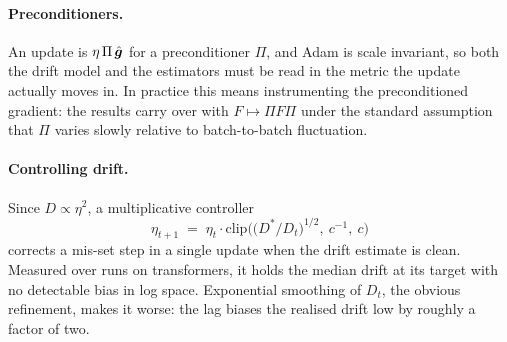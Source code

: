 \paragraph{Preconditioners.} An update is $\eta\,\Pi\,\hat{\bm{g}}$ for a preconditioner $\Pi$, and Adam
is scale invariant, so both the drift model and the estimators must be read in the metric the
update actually moves in. In practice this means instrumenting the preconditioned gradient: the
results carry over with $F \mapsto \Pi F \Pi$ under the standard assumption that $\Pi$ varies
slowly relative to batch-to-batch fluctuation.

\paragraph{Controlling drift.} Since $D \propto \eta^2$, a multiplicative controller
\begin{equation}
  \eta_{t+1} \;=\; \eta_t \cdot \mathrm{clip}\Big( \big( D^{*} / D_t \big)^{1/2},\ c^{-1},\ c \Big)
\end{equation}
corrects a mis-set step in a single update when the drift estimate is clean. Measured over runs on
transformers, it holds the median drift at its target with no detectable bias in log space.
Exponential smoothing of $D_t$, the obvious refinement, makes it worse: the lag biases the realised
drift low by roughly a factor of two.
